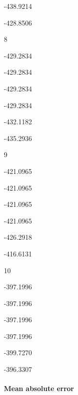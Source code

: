 \documentclass[
]{article}
\begin{document}
-438.9214

-428.8506

8

-429.2834

-429.2834

-429.2834

-429.2834

-432.1182

-435.2936

9

-421.0965

-421.0965

-421.0965

-421.0965

-426.2918

-416.6131

10

-397.1996

-397.1996

-397.1996

-397.1996

-399.7270

-396.3307

\hypertarget{mean-absolute-error}{%
\paragraph{Mean absolute error}\label{mean-absolute-error}}
\end{document}
